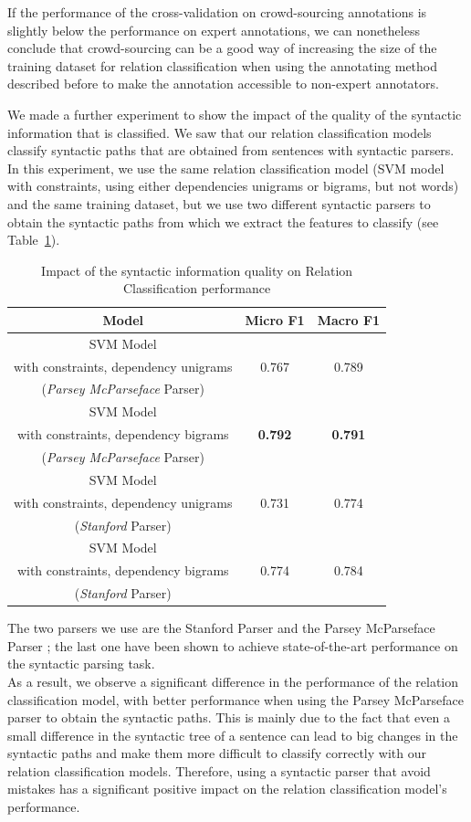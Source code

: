 \documentclass[twocolumn]{article}
\begin{document}
If the performance of the cross-validation on crowd-sourcing annotations is slightly below the performance on expert annotations, we can nonetheless conclude that crowd-sourcing can be a good way of increasing the size of the training dataset for relation classification when using the annotating method described before to make the annotation accessible to non-expert annotators.

We made a further experiment to show the impact of the quality of the syntactic information that is classified. We saw that our relation classification models classify syntactic paths that are obtained from sentences with syntactic parsers. In this experiment, we use the same relation classification model (SVM model with constraints, using either dependencies unigrams or bigrams, but not words) and the same training dataset, but we use two different syntactic parsers to obtain the syntactic paths from which we extract the features to classify (see Table~\ref{impactSyntaxRelationClassification}).

\begin{table}[t]
\center
\begin{tabular}{c||c|c}
	Model & Micro F1 & Macro F1 \\
	\hline
	\hline
	SVM Model & & \\
	with constraints, dependency unigrams & 0.767 & 0.789 \\
	(\textit{Parsey McParseface} Parser) & & \\ \hline
	SVM Model & & \\
	with constraints, dependency bigrams & \textbf{0.792} & \textbf{0.791} \\
	(\textit{Parsey McParseface} Parser) & & \\ \hline
	SVM Model & & \\
	with constraints, dependency unigrams & 0.731 & 0.774 \\
	(\textit{Stanford} Parser) & & \\ \hline
	SVM Model & & \\
	with constraints, dependency bigrams & 0.774 & 0.784 \\
	(\textit{Stanford} Parser) & &
\end{tabular}
\caption{\label{impactSyntaxRelationClassification} Impact of the syntactic information quality on Relation Classification performance}
\end{table}

The two parsers we use are the Stanford Parser \cite{chen2014fast} and the Parsey McParseface Parser \cite{andor2016globally}; the last one have been shown to achieve state-of-the-art performance on the syntactic parsing task.\\
As a result, we observe a significant difference in the performance of the relation classification model, with better performance when using the Parsey McParseface parser to obtain the syntactic paths. This is mainly due to the fact that even a small difference in the syntactic tree of a sentence can lead to big changes in the syntactic paths and make them more difficult to classify correctly with our relation classification models. Therefore, using a syntactic parser that avoid mistakes has a significant positive impact on the relation classification model's performance.
\end{document}
